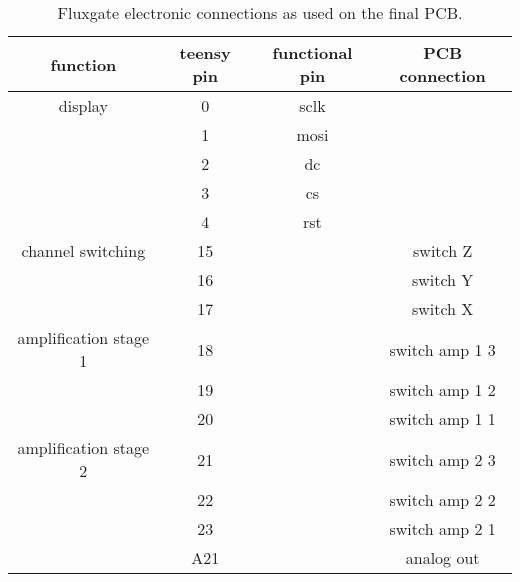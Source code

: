             \begin{table}
                \centering
                \begin{tabular}{|c|c|c|c|}
                    \hline
                    function & teensy pin & functional pin& PCB connection  \\
                    \hline
                    display&0 & sclk&\\
                    &1 & mosi&\\
                    &2 & dc&\\
                    &3 & cs&\\
                    &4 & rst&\\
                    \hline
                    channel switching&15 & & switch Z\\
                    &16 & & switch Y\\
                    &17 & & switch X\\
                    \hline
                    amplification stage 1&18 & & switch amp 1 3\\
                    &19 & & switch amp 1 2\\
                    &20 & & switch amp 1 1\\
                    \hline
                    amplification stage 2&21 & & switch amp 2 3\\
                    &22 & & switch amp 2 2\\
                    &23 & & switch amp 2 1\\
                    &A21 & & analog out\\
                    \hline
                \end{tabular}
                \caption[Fluxgate connections]{Fluxgate electronic connections as used on the final PCB.}
            \end{table}
